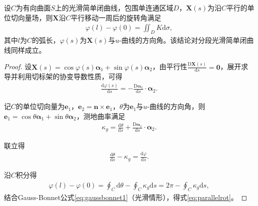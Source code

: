 \documentclass[../../main.tex]{subfiles}%
\begin{document}
\begin{theorem}
设$C$为有向曲面$S$上的光滑简单闭曲线，包围单连通区域$D$，$\boldsymbol{X}(s)$为沿$C$平行的单位切向量场，则$\boldsymbol{X}$沿$C$平行移动一周后的旋转角满足
\begin{align}
\varphi(l)-\varphi(0)=\iint_{D}K\mathrm{d}\sigma,\label{eq:parallelrot}
\end{align}
其中$l$为$C$的弧长，$\varphi(s)$为$\boldsymbol{X}(s)$与$u$-曲线的方向角。该结论对分段光滑简单闭曲线同样成立。
\end{theorem}

\begin{proof}

设$\boldsymbol{X}(s)=\cos\varphi(s)\boldsymbol{\alpha}_1+\sin\varphi(s)\boldsymbol{\alpha}_2$，由平行性$\frac{\mathrm{D}\boldsymbol{X}(s)}{\mathrm{d}s}=\boldsymbol{0}$，展开求导并利用切标架的协变导数性质，可得
\begin{align*}
\frac{\mathrm{d}\varphi(s)}{\mathrm{d}s}=-\frac{\mathrm{D}\boldsymbol{\alpha}_1}{\mathrm{d}s}\cdot\boldsymbol{\alpha}_2.
\end{align*}

记$C$的单位切向量为$\boldsymbol{e}_1$，$\boldsymbol{e}_2=\boldsymbol{n}\times\boldsymbol{e}_1$，$\theta$为$\boldsymbol{e}_1$与$u$-曲线的方向角，则$\boldsymbol{e}_1=\cos\theta\boldsymbol{\alpha}_1+\sin\theta\boldsymbol{\alpha}_2$，测地曲率满足
\begin{align*}
\kappa_g=\frac{\mathrm{d}\theta}{\mathrm{d}s}+\frac{\mathrm{D}\boldsymbol{\alpha}_1}{\mathrm{d}s}\cdot\boldsymbol{\alpha}_2.
\end{align*}

联立得
\begin{align*}
\frac{\mathrm{d}\theta}{\mathrm{d}s}-\kappa_g=\frac{\mathrm{d}\varphi}{\mathrm{d}s}.
\end{align*}

沿$C$积分得
\begin{align*}
\varphi(l)-\varphi(0)=\oint_{C}\mathrm{d}\theta-\oint_{C}\kappa_g\mathrm{d}s=2\pi-\oint_{C}\kappa_g\mathrm{d}s,
\end{align*}
结合Gauss-Bonnet公式\eqref{eq:gaussbonnet1}（光滑情形），得式\eqref{eq:parallelrot}。

\end{proof}
\end{document}
